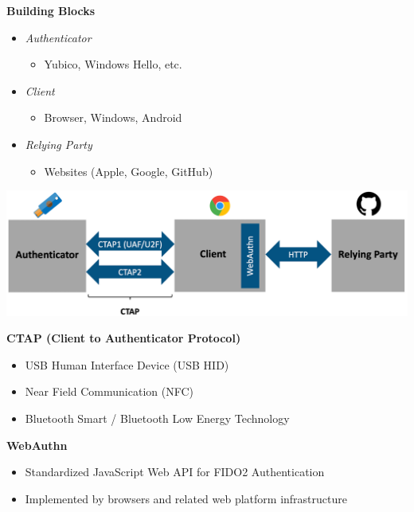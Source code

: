 \textbf{Building Blocks}
\begin{itemize}
    \item \textit{Authenticator}
    \begin{itemize}
        \item Yubico, Windows Hello, etc.
    \end{itemize}
    \item \textit{Client}
    \begin{itemize}
        \item Browser, Windows, Android
    \end{itemize}
    \item \textit{Relying Party}
    \begin{itemize}
        \item Websites (Apple, Google, GitHub)\\
    \end{itemize}
\end{itemize}
\begin{center}
    \vspace{-8pt}
    \includegraphics[width=1.0\linewidth]{./img/09-mitm/fido2_building_blocks}
    \vspace{-8pt}
\end{center}

\textbf{CTAP (Client to Authenticator Protocol)}
\begin{itemize}
    \item USB Human Interface Device (USB HID)
    \item Near Field Communication (NFC)
    \item Bluetooth Smart / Bluetooth Low Energy Technology\\
\end{itemize}

\textbf{WebAuthn}
\begin{itemize}
    \item Standardized JavaScript Web API for FIDO2 Authentication
    \item Implemented by browsers and related web platform infrastructure\\
\end{itemize}

